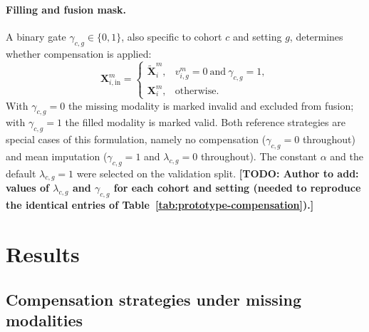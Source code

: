\documentclass[pdflatex,sn-vancouver-num]{sn-jnl}
\newcommand{\TODO}[1]{\textbf{[TODO: #1]}}
\begin{document}
\paragraph{Filling and fusion mask.}
A binary gate $\gamma_{c,g}\in\{0,1\}$, also specific to cohort $c$ and
setting $g$, determines whether compensation is applied:
\begin{equation}
  \mathbf{X}_{i,\mathrm{in}}^{m}=
  \begin{cases}
    \widetilde{\mathbf{X}}_i^{m}, & v_{i,g}^{m}=0\ \text{and}\ \gamma_{c,g}=1,\\
    \mathbf{X}_i^{m}, & \text{otherwise}.
  \end{cases}
  \label{eq:pr-fill}
\end{equation}
With $\gamma_{c,g}=0$ the missing modality is marked invalid and excluded from
fusion; with $\gamma_{c,g}=1$ the filled modality is marked valid. Both
reference strategies are special cases of this formulation, namely no
compensation ($\gamma_{c,g}=0$ throughout) and mean imputation
($\gamma_{c,g}=1$ and $\lambda_{c,g}=0$ throughout). The constant $\alpha$
and the default $\lambda_{c,g}=1$ were selected on the validation split.
\TODO{Author to add: values of $\lambda_{c,g}$ and $\gamma_{c,g}$ for each
cohort and setting (needed to reproduce the identical entries of
Table~\ref{tab:prototype-compensation}).}

\section{Results}
\label{sec:results}

\subsection{Compensation strategies under missing modalities}
\label{sec:prototype-compensation-results}
\end{document}
